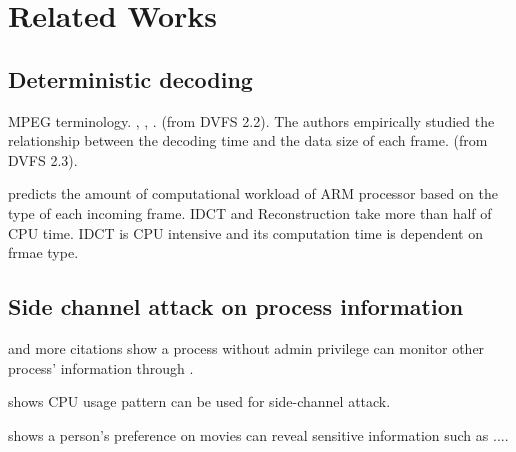 \section{Related Works}
\label{sec:relatedworks}

\subsection{Deterministic decoding}
\cite{MPEG} MPEG terminology. , , . (from DVFS 2.2). 
The authors empirically studied the relationship between the decoding time and the data size of each frame.  (from DVFS 2.3). 

\cite{DVFS}  predicts the amount of computational workload of ARM processor based on the type of each incoming frame.
IDCT and Reconstruction take more than half of CPU time. 
IDCT is CPU intensive and its computation time is dependent on frmae type.


\subsection{Side channel attack on process information}
\cite{MEMENTO} and more citations show a process without admin privilege can monitor other process' information through . 

shows CPU usage pattern can be used for side-channel attack. 

shows a person's preference on movies can reveal sensitive information such as ....
